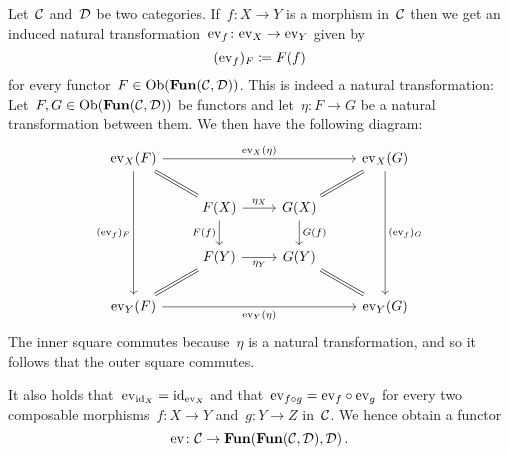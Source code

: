 \begin{remark}
  Let~$\mathcal{C}$ and~$\mathcal{D}$ be two categories.
  If~$f \colon X \to Y$ is a morphism in~$\mathcal{C}$ then we get an induced natural transformation~$\mathrm{ev}_f \colon \mathrm{ev}_X \to \mathrm{ev}_Y$ given by
  \[
              (\mathrm{ev}_f)_F
    \coloneqq  F(f)
  \]
  for every functor~$F \in \operatorname{Ob}(\mathbf{Fun}(\mathcal{C}, \mathcal{D}))$.
  This is indeed a natural transformation:
  Let~$F, G \in \operatorname{Ob}(\mathbf{Fun}(\mathcal{C}, \mathcal{D}))$ be functors and let~$\eta \colon F \to G$ be a natural transformation between them.
  We then have the following diagram:
  \[
    \begin{tikzcd}
        \ev_X(F)
        \arrow{rrr}[above]{\ev_X(\eta)}
        \arrow{ddd}[left]{(\ev_f)_F}
        \arrow[equal]{dr}
      & {}
      & {}
      & \ev_X(G)
        \arrow{ddd}[right]{(\ev_f)_G}
        \arrow[equal]{dl}
      \\
        {}
      & F(X)
        \arrow{r}[above]{\eta_X}
        \arrow{d}[left]{F(f)}
      & G(X)
        \arrow{d}[right]{G(f)}
      & {}
      \\
        {}
      & F(Y)
        \arrow{r}[below]{\eta_Y}
      & G(Y)
      & {}
      \\
        \ev_Y(F)
        \arrow{rrr}[below]{\ev_Y(\eta)}
        \arrow[equal]{ur}
      & {}
      & {}
      & \ev_Y(G)
        \arrow[equal]{ul}
    \end{tikzcd}
  \]
  The inner square commutes because~$\eta$ is a natural transformation, and so it follows that the outer square commutes.
  
  It also holds that~$\mathrm{ev}_{\mathrm{id}_X} = \mathrm{id}_{\mathrm{ev}_X}$ and that~$\mathrm{ev}_{f \circ g} = \mathrm{ev}_f \circ \mathrm{ev}_g$ for every two composable morphisms~$f \colon X \to Y$ and~$g \colon Y \to Z$ in~$\mathcal{C}$.
  We hence obtain a functor
  \[
            \mathrm{ev}
    \colon  \mathcal{C}
    \to     \mathbf{Fun}( \mathbf{Fun}(\mathcal{C}, \mathcal{D}), \mathcal{D} ) \,.
  \]

\end{remark}




